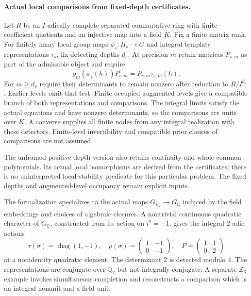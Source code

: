 \documentclass[11pt]{article}
\theoremstyle{definition}
\theoremstyle{remark}
\begin{document}
\paragraph{Actual local comparisons from fixed-depth certificates.}\label{book:x-construction-15}
Let $R$ be an $I$-adically complete separated commutative ring with finite
coefficient quotients and an injective map into a field $K$. Fix a finite matrix
rank. For finitely many
local group maps $\phi_s:H_s\to G$ and integral template representations
$\tau_s$, fix detecting depths $d_s$. At precision $m$ retain matrices $P_{s,m}$
as part of the admissible object and require
\[
\rho_m(\phi_s(h))P_{s,m}=P_{s,m}\tau_{s,m}(h).
\]
For $m\ge d_s$ require their determinants to remain nonzero after reduction to
$R/I^{d_s}$. Earlier levels omit that test. Finite occupied augmented levels
give a compatible branch of both representations and comparisons. The integral
limits satisfy the actual equations and have nonzero determinants, so the
comparisons are units over $K$. A converse supplies all finite nodes from any
integral realization with these detectors. Finite-level invertibility and
compatible prior choices of comparisons are not assumed.

The unframed positive-depth version also retains continuity and whole common
polynomials. Its actual local isomorphisms are derived from the certificates;
there is no uninterpreted local-stability predicate for this particular problem.
The fixed depths and augmented-level occupancy remain explicit inputs.

The formalization specializes to the actual maps
$G_{\mathbb Q_p}\to G_{\mathbb Q}$ induced by the field embeddings and choices
of algebraic closures. A nontrivial continuous quadratic character of
$G_{\mathbb Q}$, constructed from its action on $i^2=-1$, gives the integral
$2$-adic actions
\[
\tau(\sigma)=\operatorname{diag}(1,-1),\quad
\rho(\sigma)=\begin{pmatrix}1&-1\\0&-1\end{pmatrix},\quad
P=\begin{pmatrix}1&1\\0&2\end{pmatrix}
\]
at a nonidentity quadratic element. The determinant $2$ is detected modulo $4$.
The representations are conjugate over $\mathbb Q_2$ but not integrally
conjugate. A separate $\mathbb Z_3$ example invokes simultaneous completion
and reconstructs a comparison which is an integral nonunit and a field unit.
\end{document}
